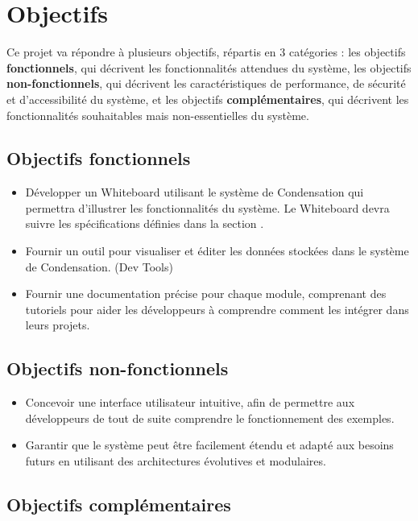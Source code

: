 \section*{Objectifs}
Ce projet va répondre à plusieurs objectifs, répartis en 3 catégories : les objectifs \textbf{fonctionnels}, qui décrivent les fonctionnalités attendues du système, les objectifs \textbf{non-fonctionnels}, qui décrivent les caractéristiques de performance, de sécurité et d'accessibilité du système, et les objectifs \textbf{complémentaires}, qui décrivent les fonctionnalités souhaitables mais non-essentielles du système.

\subsection*{Objectifs \guillemotleft fonctionnels\guillemotright}

\begin{itemize}
    \item Développer un Whiteboard utilisant le système de Condensation qui permettra d'illustrer les fonctionnalités du système. Le Whiteboard devra suivre les spécifications définies dans la section .
    \item Fournir un outil pour visualiser et éditer les données stockées dans le système de Condensation. (Dev Tools)
    \item Fournir une documentation précise pour chaque module, comprenant des tutoriels pour aider les développeurs à comprendre comment les intégrer dans leurs projets.
\end{itemize}

\subsection*{Objectifs \guillemotleft non-fonctionnels\guillemotright}

\begin{itemize}
    \item Concevoir une interface utilisateur intuitive, afin de permettre aux développeurs de tout de suite comprendre le fonctionnement des exemples.
    \item Garantir que le système peut être facilement étendu et adapté aux besoins futurs en utilisant des architectures évolutives et modulaires.
\end{itemize}

\subsection*{Objectifs \guillemotleft complémentaires\guillemotright}

